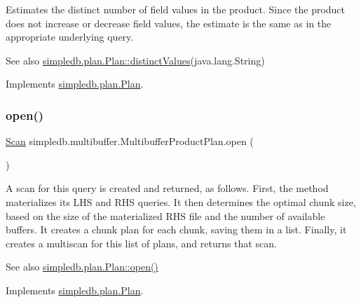 Estimates the distinct number of field values in the product. Since the product does not increase or decrease field values, the estimate is the same as in the appropriate underlying query. \begin{DoxySeeAlso}{See also}
\hyperlink{interfacesimpledb_1_1plan_1_1Plan_a55094c16c756b0c09b5c71b94d573271}{simpledb.\+plan.\+Plan\+::distinct\+Values}(java.\+lang.\+String) 
\end{DoxySeeAlso}


Implements \hyperlink{interfacesimpledb_1_1plan_1_1Plan_a55094c16c756b0c09b5c71b94d573271}{simpledb.\+plan.\+Plan}.

\mbox{\label{classsimpledb_1_1multibuffer_1_1MultibufferProductPlan_a0874bcf0d5bb9839346404d40b06eaed}} 
\subsubsection{\texorpdfstring{open()}{open()}}
{\footnotesize\ttfamily \hyperlink{interfacesimpledb_1_1query_1_1Scan}{Scan} simpledb.\+multibuffer.\+Multibuffer\+Product\+Plan.\+open (\begin{DoxyParamCaption}{ }\end{DoxyParamCaption})\hspace{0.3cm}{\ttfamily [inline]}}

A scan for this query is created and returned, as follows. First, the method materializes its L\+HS and R\+HS queries. It then determines the optimal chunk size, based on the size of the materialized R\+HS file and the number of available buffers. It creates a chunk plan for each chunk, saving them in a list. Finally, it creates a multiscan for this list of plans, and returns that scan. \begin{DoxySeeAlso}{See also}
\hyperlink{interfacesimpledb_1_1plan_1_1Plan_aaa4c15cda4e9c0d52308850f9f13ff99}{simpledb.\+plan.\+Plan\+::open()} 
\end{DoxySeeAlso}


Implements \hyperlink{interfacesimpledb_1_1plan_1_1Plan_aaa4c15cda4e9c0d52308850f9f13ff99}{simpledb.\+plan.\+Plan}.

\mbox{\label{classsimpledb_1_1multibuffer_1_1MultibufferProductPlan_a45cef849c8ac76cce183b7d9909929c1}} 
